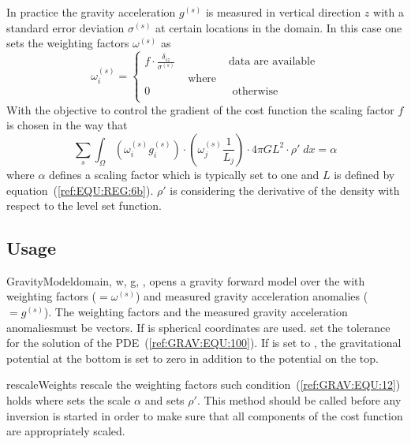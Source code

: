 In practice the gravity acceleration $g^{(s)}$ is measured in vertical
direction $z$ with a standard error deviation $\sigma^{(s)}$ at certain
locations in the domain.
In this case one sets the weighting factors $\omega^{(s)}$ as
\begin{equation}\label{ref:GRAV:EQU:11}
\omega^{(s)}_i 
= \left\{
\begin{array}{lcl}
f \cdot  \frac{\delta_{iz}}{\sigma^{(s)}} & & \mbox{data are available} \\
& \mbox{ where } & \\
0 & & \mbox{ otherwise } \\
\end{array}
\right.
\end{equation} 
With the objective to control the 
gradient of the cost function 
the scaling factor $f$ is chosen in the way that
\begin{equation}\label{ref:GRAV:EQU:12}
\sum_{s} \int_{\Omega} ( \omega^{(s)}_i g^{(s)}_i ) \cdot ( \omega^{(s)}_j \frac{1}{L_j} ) \cdot 4\pi G L^2 \cdot \rho' \;  dx =\alpha
\end{equation} 
where $\alpha$ defines a scaling factor which is typically set to one and $L$ is defined by equation~(\ref{ref:EQU:REG:6b}). $\rho'$ is considering the 
derivative of the density with respect to the level set function. 


\subsection{Usage}


\begin{classdesc}{GravityModel}{domain, 
w, g,
,
}
opens a gravity forward model over the \Domain {} with 
weighting factors  ($=\omega^{(s)}$) and measured gravity acceleration anomalies ($=g^{(s)}$).
The weighting factors and the  measured gravity acceleration anomalies\member must be vectors.
If  is \True spherical coordinates are used. 
 set the tolerance for the solution of the PDE~(\ref{ref:GRAV:EQU:100}).
If  is set to  \True, the gravitational potential 
at the bottom is set to zero in addition to the potential on the top. 
\end{classdesc}

\begin{methoddesc}[GravityModel]{rescaleWeights}{
 }
rescale the weighting factors such condition~(\ref{ref:GRAV:EQU:12}) holds where 
 sets the scale $\alpha$
and  sets $\rho'$. This method should be called before any inversion is started
in order to make sure that all components of the cost function are appropriately scaled.
\end{methoddesc}


